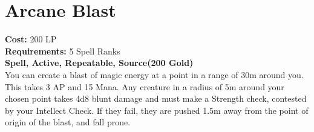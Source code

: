 \section{Arcane Blast}\label{spell:arcaneBlast}
\textbf{Cost:} 200 LP\\
\textbf{Requirements:} 5 Spell Ranks\\
\textbf{Spell, Active, Repeatable, Source(200 Gold)}\\
You can create a blast of magic energy at a point in a range of 30m around you.
This takes 3 AP and 15 Mana.
Any creature in a radius of 5m around your chosen point takes 4d8 blunt damage and must make a Strength check, contested by your Intellect Check.
If they fail, they are pushed 1.5m away from the point of origin of the blast, and fall prone.
